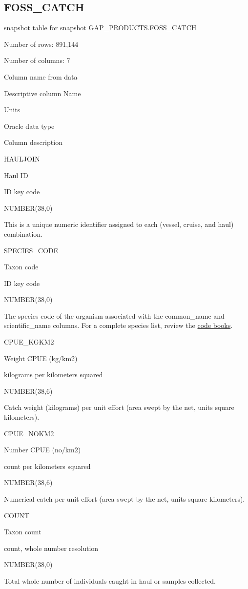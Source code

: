 \documentclass[
  letterpaper,
  oneside,
  open=any]{scrbook}
\begin{document}
\subsection{FOSS\_CATCH}\label{foss_catch}

snapshot table for snapshot GAP\_PRODUCTS.FOSS\_CATCH

Number of rows: 891,144

Number of columns: 7

Column name from data

Descriptive column Name

Units

Oracle data type

Column description

HAULJOIN

Haul ID

ID key code

NUMBER(38,0)

This is a unique numeric identifier assigned to each (vessel, cruise,
and haul) combination.

SPECIES\_CODE

Taxon code

ID key code

NUMBER(38,0)

The species code of the organism associated with the common\_name and
scientific\_name columns. For a complete species list, review the
\href{https://www.fisheries.noaa.gov/resource/document/groundfish-survey-species-code-manual-and-data-codes-manual}{code
books}.

CPUE\_KGKM2

Weight CPUE (kg/km2)

kilograms per kilometers squared

NUMBER(38,6)

Catch weight (kilograms) per unit effort (area swept by the net, units
square kilometers).

CPUE\_NOKM2

Number CPUE (no/km2)

count per kilometers squared

NUMBER(38,6)

Numerical catch per unit effort (area swept by the net, units square
kilometers).

COUNT

Taxon count

count, whole number resolution

NUMBER(38,0)

Total whole number of individuals caught in haul or samples collected.
\end{document}
